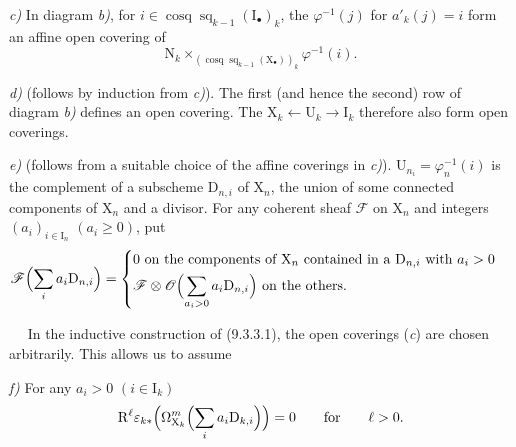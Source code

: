 \documentclass[11pt,leqno]{article}
\newcommand{\Page}[1]{\ifvmode\noindent\else\unskip\ \fi{\footnotesize\textcolor{gray}{[p.\,#1]}}\ \ignorespaces}
\begin{document}
\textit{c)} In diagram \textit{b)}, for \(i\in\operatorname{cosq}\operatorname{sq}_{k-1}(\mathrm{I}_{\bullet})_{k}\), the \(\varphi^{-1}(j)\) for \(a'_{k}(j)=i\) form an affine open covering of
\[
\mathrm{N}_{k}
\times_{(\operatorname{cosq}\operatorname{sq}_{k-1}(\mathrm{X}_{\bullet}))_{k}}
\varphi^{-1}(i).
\]

\textit{d)} (follows by induction from \textit{c)}). The first (and hence the second) row of diagram \textit{b)} defines an open covering. The \(\mathrm{X}_{k}\leftarrow\mathrm{U}_{k}\to\mathrm{I}_{k}\) therefore also form open coverings.

\textit{e)} (follows from a suitable choice of the affine coverings in \textit{c)}). \(\mathrm{U}_{n_i}=\varphi_{n}^{-1}(i)\) is the complement of a subscheme \(\mathrm{D}_{n,i}\) of \(\mathrm{X}_{n}\), the union of some connected components of \(\mathrm{X}_{n}\) and a divisor. For any coherent sheaf \(\mathscr{F}\) on \(\mathrm{X}_{n}\) and integers \((a_{i})_{i\in\mathrm{I}_{n}}\) \((a_{i}\geq0)\), put
\[
\mathscr{F}\Bigl(\sum_{i}a_{i}\mathrm{D}_{n,i}\Bigr)
=
\begin{cases}
0\text{ on the components of }\mathrm{X}_{n}
 \text{ contained in a }\mathrm{D}_{n,i}\text{ with }a_{i}>0\\[3pt]
\displaystyle
\mathscr{F}\otimes\mathscr{O}\Bigl(\sum_{a_{i}>0}a_{i}\mathrm{D}_{n,i}\Bigr)
 \text{ on the others.}
\end{cases}
\]

\Page{52}
In the inductive construction of (9.3.3.1), the open coverings (\textit{c}) are chosen arbitrarily. This allows us to assume

\textit{f)} For any \(a_{i}>0\) \((i\in\mathrm{I}_{k})\)
\[
\mathrm{R}^{\ell}\varepsilon_{k*}
\Bigl(\Omega_{\mathrm{X}_{k}}^{m}\Bigl(\sum_{i}a_{i}\mathrm{D}_{k,i}\Bigr)\Bigr)=0
\qquad\text{for}\qquad\ell>0.
\]
\end{document}
